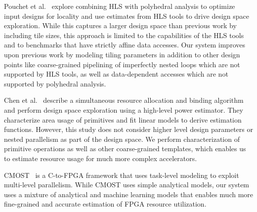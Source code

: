 Pouchet et al.~\cite{pouchet13fpga}
explore combining HLS with polyhedral analysis to optimize input designs for locality
and use estimates from HLS tools to drive design space exploration. While this captures a larger design
space than previous work by including tile sizes, this approach is limited to the capabilities
of the HLS tools and to benchmarks that have strictly affine data accesses. Our system improves
upon previous work by modeling tiling
parameters in addition to other design points like coarse-grained pipelining of imperfectly nested loops
which are not supported by HLS tools, as well as data-dependent accesses which are not supported by polyhedral analysis.

Chen et al.~\cite{cong_powerdse} describe a simultaneous resource allocation and binding algorithm
and perform design space exploration using a high-level power estimator. They characterize area
usage of primitives and fit linear models to derive estimation
functions. However, this study does not consider higher level design parameters or nested
parallelism as part of the design space. We perform characterization of primitive
operations as well as other coarse-grained templates, which enables us to estimate resource usage for
much more complex accelerators.

CMOST~\cite{cong_cmost} is a C-to-FPGA framework that uses task-level modeling
to exploit multi-level parallelism. While CMOST uses simple analytical models, our system uses a mixture of
analytical and machine learning models that enables much more fine-grained and accurate estimation of FPGA resource utilization.








